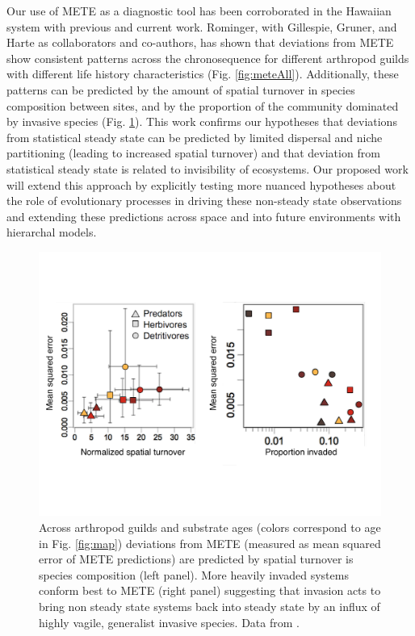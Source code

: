 \documentclass[11pt]{article}
\begin{document}
Our use of METE as a diagnostic tool has been corroborated in the
Hawaiian system with previous and current work.  Rominger, with
Gillespie, Gruner, and Harte as collaborators and co-authors, has
shown that deviations from METE show consistent patterns across the
chronosequence for different arthropod guilds with different life
history characteristics (Fig. \ref{fig:meteAll}).  Additionally, these
patterns can be predicted by the amount of spatial turnover in species
composition between sites, and by the proportion of the community
dominated by invasive species (Fig. \ref{fig:meteExplc}). This work
confirms our hypotheses that deviations from statistical steady state
can be predicted by limited dispersal and niche partitioning (leading
to increased spatial turnover) and that deviation from statistical
steady state is related to invisibility of ecosystems.  Our proposed
work will extend this approach by explicitly testing more nuanced
hypotheses about the role of evolutionary processes in driving these
non-steady state observations and extending these predictions across
space and into future environments with hierarchal models.

\begin{figure}[!htb]
  \centering
  \includegraphics[scale=0.4]{../figs/fig_meteExplc.pdf}
  \caption{Across arthropod guilds and substrate ages (colors
    correspond to age in Fig. \ref{fig:map}) deviations from METE
    (measured as mean squared error of METE predictions) are predicted
    by spatial turnover is species composition (left panel).  More
    heavily invaded systems conform best to METE (right panel)
    suggesting that invasion acts to bring non steady state systems
    back into steady state by an influx of highly vagile, generalist
    invasive species. Data from \citep{gruner2007}.}
  \label{fig:meteExplc}
\end{figure}
\end{document}
